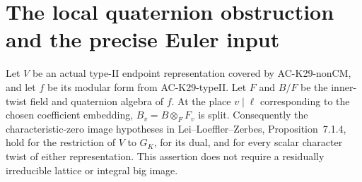 \section{The local quaternion obstruction and the precise Euler input}
\label{sec:cubic-euler-prerequisites}

\begin{proposition}
\label{AC-K29-split}
Let $V$ be an actual type-II endpoint representation covered by
AC-K29-nonCM, and let $f$ be its modular form from AC-K29-typeII.
Let $F$ and $B/F$ be the inner-twist field and quaternion algebra
of $f$.  At the place $v\mid\ell$ corresponding to the chosen
coefficient embedding, $B_v=B\otimes_F F_v$ is split.
Consequently the characteristic-zero image hypotheses in
Lei--Loeffler--Zerbes, Proposition~7.1.4, hold for the restriction
of $V$ to $G_K$, for its dual, and for every scalar character twist
of either representation.  This assertion does not require a
residually irreducible lattice or integral big image.
\end{proposition}
